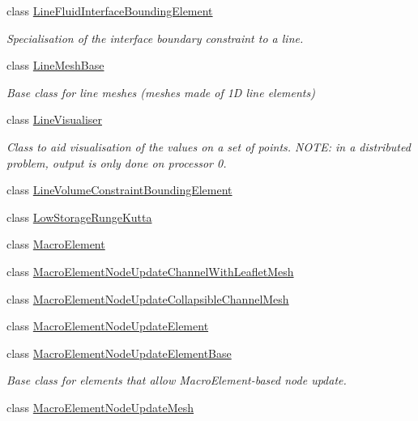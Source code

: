 \begin{DoxyCompactItemize}
class \hyperlink{classoomph_1_1LineFluidInterfaceBoundingElement}{Line\+Fluid\+Interface\+Bounding\+Element}
\begin{DoxyCompactList}\small\item\em Specialisation of the interface boundary constraint to a line. \end{DoxyCompactList}\item 
class \hyperlink{classoomph_1_1LineMeshBase}{Line\+Mesh\+Base}
\begin{DoxyCompactList}\small\item\em Base class for line meshes (meshes made of 1D line elements) \end{DoxyCompactList}\item 
class \hyperlink{classoomph_1_1LineVisualiser}{Line\+Visualiser}
\begin{DoxyCompactList}\small\item\em Class to aid visualisation of the values on a set of points. N\+O\+TE\+: in a distributed problem, output is only done on processor 0. \end{DoxyCompactList}\item 
class \hyperlink{classoomph_1_1LineVolumeConstraintBoundingElement}{Line\+Volume\+Constraint\+Bounding\+Element}
\item 
class \hyperlink{classoomph_1_1LowStorageRungeKutta}{Low\+Storage\+Runge\+Kutta}
\item 
class \hyperlink{classoomph_1_1MacroElement}{Macro\+Element}
\item 
class \hyperlink{classoomph_1_1MacroElementNodeUpdateChannelWithLeafletMesh}{Macro\+Element\+Node\+Update\+Channel\+With\+Leaflet\+Mesh}
\item 
class \hyperlink{classoomph_1_1MacroElementNodeUpdateCollapsibleChannelMesh}{Macro\+Element\+Node\+Update\+Collapsible\+Channel\+Mesh}
\item 
class \hyperlink{classoomph_1_1MacroElementNodeUpdateElement}{Macro\+Element\+Node\+Update\+Element}
\item 
class \hyperlink{classoomph_1_1MacroElementNodeUpdateElementBase}{Macro\+Element\+Node\+Update\+Element\+Base}
\begin{DoxyCompactList}\small\item\em Base class for elements that allow Macro\+Element-\/based node update. \end{DoxyCompactList}\item 
class \hyperlink{classoomph_1_1MacroElementNodeUpdateMesh}{Macro\+Element\+Node\+Update\+Mesh}
\item 

\end{DoxyCompactItemize}

